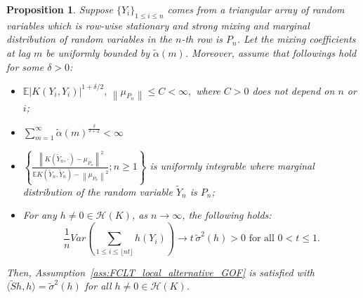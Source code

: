 \documentclass[11pt]{article}
\newcommand{\cH}{\mathcal{H}}
\newcommand{\bE}{\mathbb{E}}
\theoremstyle{plain}
\newtheorem{proposition}{Proposition}
\theoremstyle{definition}
\theoremstyle{remark}
\begin{document}
\begin{proposition}\label{prop:verify_FCLT_GOF_Alt}
    Suppose $\{Y_i\}_{1\leq i \leq n}$ comes from a triangular array of random variables which is row-wise stationary and strong mixing and marginal distribution of random variables in the $n$-th row is $P_n$. Let the mixing coefficients at lag $m$ be uniformly bounded by $\tilde{\alpha}(m)$. Moreover, assume that followings hold for some $\delta>0$:
    \begin{itemize}
        \item [(i)] \(\bE |K(Y_i,Y_i)|^{1+\delta/2},\,\left\|\mu_{P_n}\right\|\leq C<\infty,\) where $C>0$ does not depend on $n$ or $i$;
        \item [(ii)] \(\sum_{m=1}^{\infty}\tilde{\alpha}(m)^{\frac{\delta}{\delta+2}}<\infty\)
        \item [(iii)] \(\left\{\frac{\left\|K(\tilde{Y}_n,\cdot)-\mu_{P_n}\right\|^2}{\bE K(\tilde{Y}_n,\tilde{Y}_n)-\left\|\mu_{P_n}\right\|^2};n\geq 1\right\}\) is uniformly integrable where marginal distribution of the random variable $\tilde{Y}_n$ is $P_n$;
        \item [(iv)] For any $h\neq 0 \in \cH(K)$, as $n\to \infty$, the following holds:
        \[\frac{1}{n}Var \left(\sum_{1\leq i \leq \lfloor nt \rfloor} h(Y_i)\right)\to t\,\tilde{\sigma}^2(h)>0\text{ for all }0<t\leq 1. \]
    \end{itemize}
    Then, Assumption~\ref{ass:FCLT_local_alternative_GOF} is satisfied with $\langle \tilde{S}h,h\rangle=\tilde{\sigma}^2(h)$ for all $h\neq 0\in \cH(K)$.
\end{proposition}
\end{document}
